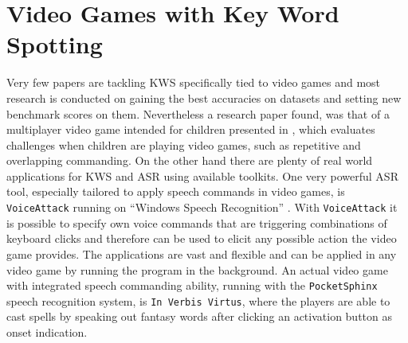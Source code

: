 
\section{Video Games with Key Word Spotting}\label{sec:prev_kws_games}
Very few papers are tackling KWS specifically tied to video games and most research is conducted on gaining the best accuracies on datasets and setting new benchmark scores on them.
Nevertheless a research paper found, was that of a multiplayer video game intended for children presented in \cite{Harshavardhan2015}, which evaluates challenges when children are playing video games, such as repetitive and overlapping commanding.
On the other hand there are plenty of real world applications for KWS and ASR using available toolkits.
One very powerful ASR tool, especially tailored to apply speech commands in video games, is \texttt{VoiceAttack} running on \enquote{Windows Speech Recognition} \cite{Xiong2017}.
With \texttt{VoiceAttack} it is possible to specify own voice commands that are triggering combinations of keyboard clicks and therefore can be used to elicit any possible action the video game provides.
The applications are vast and flexible and can be applied in any video game by running the program in the background.
An actual video game with integrated speech commanding ability, running with the \texttt{PocketSphinx} \cite{Huggins2006} speech recognition system, is \texttt{In Verbis Virtus}, where the players are able to cast spells by speaking out fantasy words after clicking an activation button as onset indication.